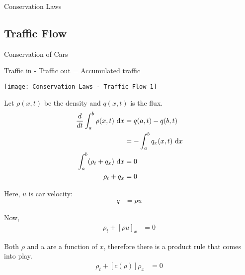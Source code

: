 \documentclass{article}
\begin{document}
{Conservation Laws}
\newpage
\subsection{Traffic Flow}
Conservation of Cars

Traffic in - Traffic out = Accumulated traffic

\begin{center}
  \texttt{[image: Conservation Laws - Traffic Flow 1]}
\end{center}

Let $\rho(x, t)$ be the density and $q(x, t)$ is the flux.
%
\begin{align}
  \frac{d}{dt} \int^b_a \rho(x, t)\ \text dx
  & = q(a, t) - q(b, t)\\
  & = -\int^b_a q_x (x, t)\ \text dx\\
  \int^b_a (\rho_t + q_x)\ \text dx & = 0\\
  \rho_t + q_x & = 0
\end{align}

Here, $u$ is car velocity:
%
\begin{align}
  q & = pu
\end{align}

Now,
%
\begin{align}
  \rho_t + [\rho u]_x & = 0
\end{align}

Both $\rho$ and $u$ are a function of $x$, therefore there is a
product rule that comes into play.
%
\begin{align}
  \rho_t + [c(\rho)]\rho_x & = 0
\end{align}
\end{document}
